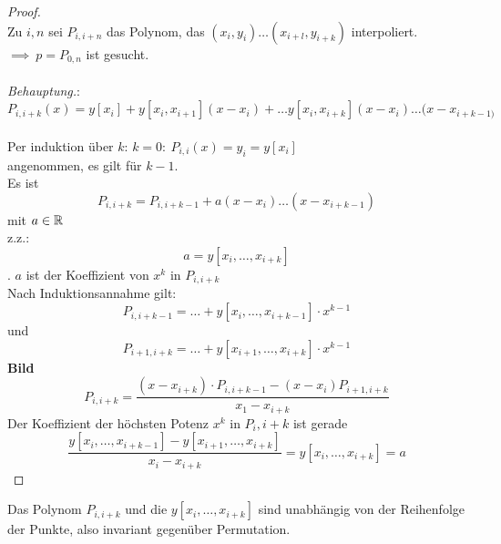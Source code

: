 \begin{proof}\hfill\\
    Zu $i,n$ sei $P_{i,i+n}$ das Polynom, das $(x_i,y_i)\dots(x_{i+l},y_{i+k})$ interpoliert. $\implies \ p= P_{0,n}$ ist 
    gesucht.\\\\
    \emph{Behauptung.}:\(P_{i,i+k}(x)= y[x_i]+y[x_i,x_{i+1}](x-x_i)+\dots y[x_i,x_{i+k}](x-x_i)\dots (x-x_{i+k-1)} \)\\ \\
    Per induktion über $k$: $k=0 : \ P_{i,i}(x)=y_i=y[x_i]$ \\
    angenommen, es gilt für $k-1$.\\
    Es ist $$P_{i,i+k}=P_{i,i+k-1}+a(x-x_i)\dots(x-x_{i+k-1})$$ mit $a\in\mathbb{R}$\\
    z.z.: $$a=y[x_i,\dots ,x_{i+k}]$$. $a$ ist der Koeffizient von $x^k$ in $P_{i,i+k}$\\
    Nach Induktionsannahme gilt:\\
    \[P_{i,i+k-1}=\dots+y[x_i,\dots ,x_{i+k-1}]\cdot x^{k-1}\]
    und
    \[
    P_{i+1,i+k}=\dots+y[x_{i+1},\dots ,x_{i+k}]\cdot x^{k-1}
    \]
    \textbf{Bild}\\
    \[
    P_{i,i+k}=\frac{(x-x_{i+k})\cdot P_{i,i+k-1}-(x-x_i)P_{i+1,i+k}}{x_1-x_{i+k}}
    \]
    Der Koeffizient der höchsten Potenz $x^k$ in $P{_i, i+k}$ ist gerade\[
    \frac{y[x_i, \dots, x_{i+k-1}] - y[x_{i+1},\dots, x_{i+k}]}{x_i - x_{i+k}}
     = y[x_i, \dots, x_{i+k}] = a\]

\end{proof}
\begin{remark}
    Das Polynom $P_{i, i+k}$ und die $y[x_i, \dots, x_{i+k}]$ sind unabhängig von der Reihenfolge
    der Punkte, also invariant gegenüber Permutation.
\end{remark}
